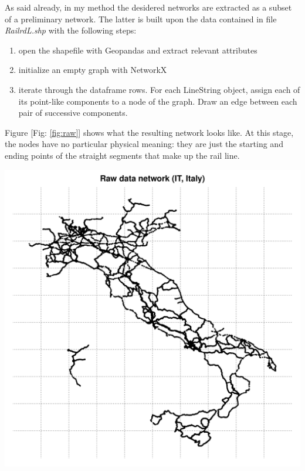 As said already, in my method the desidered networks are extracted as a subset of a preliminary network. 
The latter is built upon the data contained in file \textit{RailrdL.shp} with the following steps:
\newline \noindent
\begin{minipage}{0.5\textwidth}
\begin{enumerate}
    \item open the shapefile with Geopandas and extract relevant attributes
     \item initialize an empty graph with NetworkX
     \item iterate through the dataframe rows. For each LineString object, assign each of its point-like components to a node of the graph. Draw an edge between each pair of successive components.
\end{enumerate}
Figure [Fig: \ref{fig:raw}] shows what the resulting network looks like. At this stage, the nodes have no particular physical meaning: they are just the starting and ending points of the straight segments that make up the rail line.
\end{minipage}
\hfill
\begin{minipage}{0.48\textwidth}
    \includegraphics[width = \textwidth]{latex_source/images/railways/raw_networks/raw_IT_network.pdf}
    \label{fig:raw}
\end{minipage}
